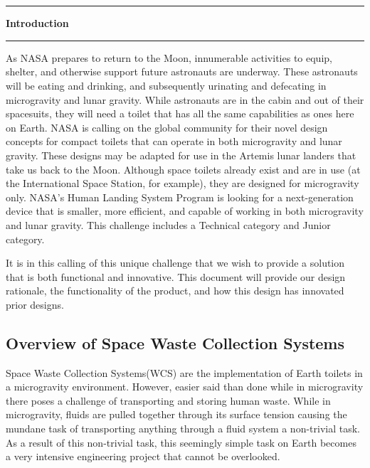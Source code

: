 \pagebreak
\chapter[Introduction]{}\vspace{-2cm}\noindent\rule{\textwidth}{2.5pt}
\thispagestyle{empty}

\vspace{5cm}\textbf{\huge{Introduction}}

\medskip\noindent\rule{\textwidth}{1pt}

As NASA prepares to return to the Moon, innumerable activities to equip, shelter, and otherwise support future astronauts are underway.  These astronauts will be eating and drinking, and subsequently urinating and defecating in microgravity and lunar gravity.  While astronauts are in the cabin and out of their spacesuits, they will need a toilet that has all the same capabilities as ones here on Earth. NASA is calling on the global community for their novel design concepts for compact toilets that can operate in both microgravity and lunar gravity.  These designs may be adapted for use in the Artemis lunar landers that take us back to the Moon.  Although space toilets already exist and are in use (at the International Space Station, for example), they are designed for microgravity only.  NASA’s Human Landing System Program is looking for a next-generation device that is smaller, more efficient, and capable of working in both microgravity and lunar gravity. This challenge includes a Technical category and Junior category.

\pagebreak
It is in this calling of this unique challenge that we wish to provide a solution that is both functional and innovative. This document will provide our design rationale, the functionality of the product, and how this design has innovated prior designs.  

\section[Space Waste Collection Systems]{Overview of Space Waste Collection Systems}
Space Waste Collection Systems(WCS) are the implementation of Earth toilets in a microgravity environment. However, easier said than done while in microgravity there poses a challenge of transporting and storing human waste. While in microgravity, fluids are pulled together through its surface tension causing the mundane task of transporting anything through a fluid system a non-trivial task. As a result of this non-trivial task, this seemingly simple task on Earth becomes a very intensive engineering project that cannot be overlooked.


